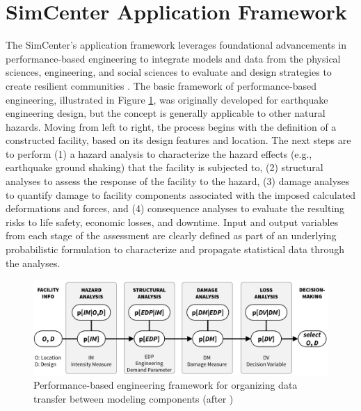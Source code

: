 \section{SimCenter Application Framework}

The SimCenter’s application framework leverages foundational advancements in performance-based engineering to integrate models and data from the physical sciences, engineering, and social sciences to evaluate and design strategies to create resilient communities \citep{deierlein2020cloud}.  The basic framework of performance-based engineering, illustrated in Figure \ref{fig:intro_PBE_framework}, was originally developed for earthquake engineering design, but the concept is generally applicable to other natural hazards.  Moving from left to right, the process begins with the definition of a constructed facility, based on its design features and location. The next steps are to perform (1) a hazard analysis to characterize the hazard effects (e.g., earthquake ground shaking) that the facility is subjected to, (2) structural analyses to assess the response of the facility to the hazard, (3) damage analyses to quantify damage to facility components associated with the imposed calculated deformations and forces, and (4) consequence analyses to evaluate the resulting risks to life safety, economic losses, and downtime.  Input and output variables from each stage of the assessment are clearly defined as part of an underlying probabilistic formulation to characterize and propagate statistical data through the analyses.

\begin{figure}[htb]
    \centering
    \includegraphics[width=1.0\textwidth, angle = 0]{Figures/PBE_framework.png}
    \caption{Performance-based engineering framework for organizing data transfer between modeling components (after \cite{porter2003overview})}
    \label{fig:intro_PBE_framework}
\end{figure}

